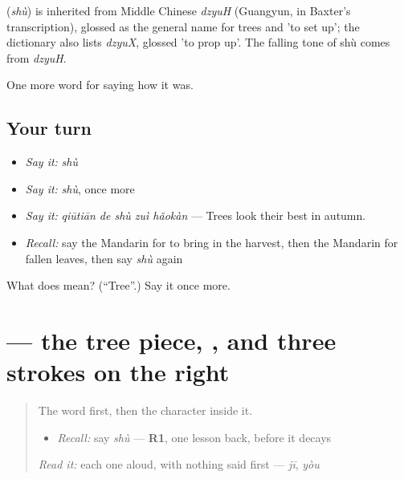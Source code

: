 \begin{cousinweb}
\textbf{} (\emph{shù}) is inherited from Middle Chinese \emph{dzyuH} (Guangyun, in Baxter's transcription), glossed as the general name for trees and 'to set up'; the dictionary also lists \emph{dzyuX}, glossed 'to prop up'. The falling tone of shù comes from \emph{dzyuH}.
\end{cousinweb}

\begin{grammarlens}[title={What you've built}]
One more word for saying how it was.
\end{grammarlens}

\subsection*{Your turn}
\begin{itemize}
\raggedright
  \item \emph{Say it:} \emph{shù}
  \item \emph{Say it:} \emph{shù}, once more
  \item \emph{Say it:} \emph{qiūtiān de shù zuì hǎokàn} — Trees look their best in autumn.
  \item \emph{Recall:} say the Mandarin for to bring in the harvest, then the Mandarin for fallen leaves, then say \emph{shù} again
\end{itemize}

\begin{tcolorbox}[breakable,colback=teal!4,colframe=teal!35!black,title={Before you move on}]
What does  mean? (\textquotedblleft{}Tree\textquotedblright{}.) Say it once more.
\end{tcolorbox}
\section[\texorpdfstring{\zh{树} (shù)}{树 (shù)}]{ — the tree piece, , and three strokes on the right}

\label{lesson:ZH-W516-shu-tree}



\begin{quote}
The word first, then the character inside it.

\begin{itemize}
\raggedright
  \item \emph{Recall:} say \emph{shù} — \textbf{R1}, one lesson back, before it decays
\end{itemize}

\begin{quote}
 
\end{quote}

\emph{Read it:} each one aloud, with nothing said first — \emph{jī}, \emph{yòu}
\end{quote}

